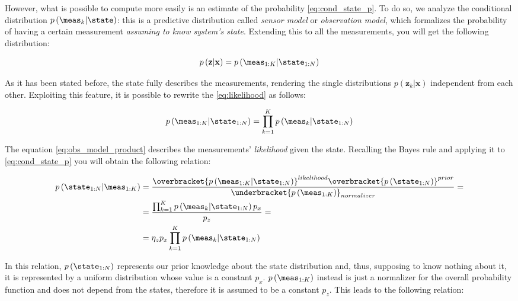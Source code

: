 However, what is possible to compute more easily is an estimate of the probability \ref{eq:cond_state_p}. To do so, we analyze the conditional distribution $p\left(\meas_k | \state\right)$: this is a predictive distribution called \textit{sensor model} or \textit{observation model}, which formalizes the probability of having a certain measurement \textit{assuming to know system's state}. Extending this to all the measurements, you will get the following distribution:

\begin{equation}
    p\left(\mathbf{z} | \mathbf{x}\right) = p\left(\meas_{1:K} | \state_{1:N}\right)
    \label{eq:likelihood}
\end{equation}

As it has been stated before, the state fully describes the measurements, rendering the single distributions $p\left(\mathbf{z}_k | \mathbf{x}\right)$ independent from each other. Exploiting this feature, it is possible to rewrite the \ref{eq:likelihood} as follows:

\begin{equation}
    \label{eq:obs_model_product}
    p\left(\meas_{1:K} | \state_{1:N}\right) = 
        \prod_{k = 1}^{K} p\left(\meas_k | \state_{1:N}\right)
\end{equation}

The equation \ref{eq:obs_model_product} describes the measurements' \textit{likelihood} given the state. Recalling the Bayes rule \cite{bayes-theorem} and applying it to \ref{eq:cond_state_p} you will obtain the following relation:

\begin{align*}
    p\left(\state_{1:N} | \meas_{1:K}\right) &= \frac{\overbracket{p\left(\meas_{1:K} | \state_{1:N}\right)}^{likelihood} \overbracket{p\left(\state_{1:N}\right)}^{prior}}{\underbracket{p\left(\meas_{1:K}\right)}_{normalizer}} = \\
    &= \frac{\prod_{k = 1}^{K} p\left(\meas_k | \state_{1:N}\right) p_x}{p_z} = \\
    &= \eta_{z} p_x \prod_{k = 1}^{K} p\left(\meas_k | \state_{1:N}\right)
\end{align*}

\noindent In this relation, $p\left(\state_{1:N}\right)$ represents our prior knowledge about the state distribution and, thus, supposing to know nothing about it, it is represented by a uniform distribution whose value is a constant $p_x$. $p\left(\meas_{1:K}\right)$ instead is just a normalizer for the overall probability function and does not depend from the states, therefore it is assumed to be a constant $p_z$. This leads to the following relation:

